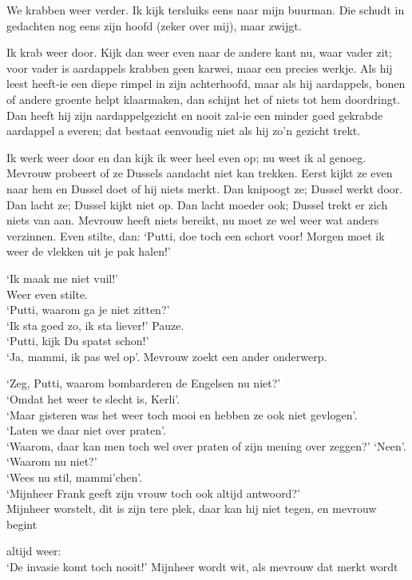 \documentclass{book}
\begin{document}
We krabben weer verder. Ik kijk tersluiks eens naar mijn buurman. Die schudt in
gedachten nog eens zijn hoofd (zeker over mij), maar zwijgt.

Ik krab weer door. Kijk dan weer even naar de andere kant nu, waar vader zit;
voor vader is aardappels krabben geen karwei, maar een precies werkje. Als hij
leest heeft-ie een diepe rimpel in zijn achterhoofd, maar als hij aardappels,
bonen of andere groente helpt klaarmaken, dan schijnt het of niets tot hem
doordringt. Dan heeft hij zijn aardappelgezicht en nooit zal-ie een minder goed
gekrabde aardappel a everen; dat bestaat eenvoudig niet als hij zo'n gezicht
trekt.

Ik werk weer door en dan kijk ik weer heel even op; nu weet ik al genoeg.
Mevrouw probeert of ze Dussels aandacht niet kan trekken. Eerst kijkt ze even
naar hem en Dussel doet of hij niets merkt. Dan knipoogt ze; Dussel werkt door.
Dan lacht ze; Dussel kijkt niet op. Dan lacht moeder ook; Dussel trekt er zich
niets van aan. Mevrouw heeft niets bereikt, nu moet ze wel weer wat anders
verzinnen. Even stilte, dan: `Putti, doe toch een schort voor! Morgen moet ik
weer de vlekken uit je pak halen!'

`Ik maak me niet vuil!'\\
Weer even stilte.\\
`Putti, waarom ga je niet
zitten?'\\
`Ik sta goed zo, ik sta liever!' Pauze.\\
`Putti, kijk Du spatst
schon!'\\
`Ja, mammi, ik pas wel op'. Mevrouw zoekt een ander onderwerp.

`Zeg, Putti, waarom bombarderen de Engelsen nu niet?'\\
`Omdat het weer te
slecht is, Kerli'.\\
`Maar gisteren was het weer toch mooi en hebben ze ook niet
gevlogen'.\\
`Laten we daar niet over praten'.\\
`Waarom, daar kan men toch wel
over praten of zijn mening over zeggen?' `Neen'.\\
`Waarom nu niet?'\\
`Wees nu
stil, mammi'chen'.\\
`Mijnheer Frank geeft zijn vrouw toch ook altijd
antwoord?'\\
Mijnheer worstelt, dit is zijn tere plek, daar kan hij niet tegen,
en mevrouw begint

altijd weer:\\
`De invasie komt toch nooit!' Mijnheer wordt wit, als mevrouw dat
merkt wordt
\end{document}
